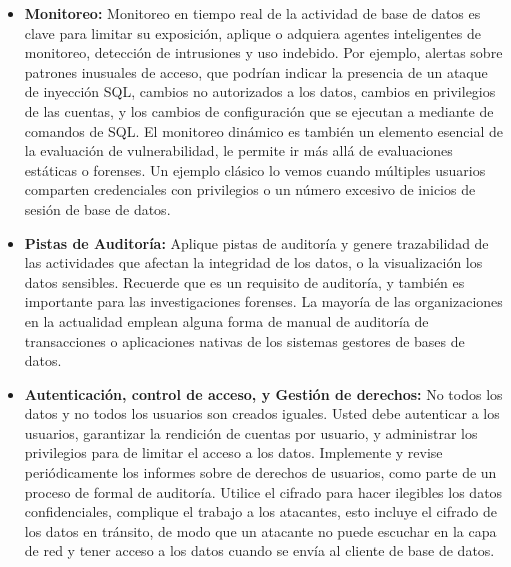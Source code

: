 \documentclass[%
 reprint,
 amsmath,amssymb,
 aps,
]{revtex4-1}
\begin{document}
\begin{itemize}
	\item \textbf{Monitoreo: }Monitoreo en tiempo real de la actividad de base de datos es clave para limitar su exposición, aplique o adquiera agentes inteligentes de monitoreo, detección de intrusiones y uso indebido.
Por ejemplo, alertas sobre patrones inusuales de acceso, que podrían indicar la presencia de un ataque de inyección SQL, cambios no autorizados a los datos, cambios en privilegios de las cuentas, y los cambios de configuración que se ejecutan a mediante de comandos de SQL.
El monitoreo dinámico es también un elemento esencial de la evaluación de vulnerabilidad, le permite ir más allá de evaluaciones estáticas o forenses. Un ejemplo clásico lo vemos cuando múltiples usuarios comparten credenciales con privilegios o un número excesivo de inicios de sesión de base de datos.
	\item \textbf{Pistas de Auditoría: }Aplique pistas de auditoría y genere trazabilidad de las actividades que afectan la integridad de los datos, o la visualización los datos sensibles.
Recuerde que es un requisito de auditoría, y también es importante para las investigaciones forenses.
La mayoría de las organizaciones en la actualidad emplean alguna forma de manual de auditoría de transacciones o aplicaciones nativas de los sistemas gestores de bases de datos. 
	\item \textbf{Autenticación, control de acceso, y Gestión de derechos: }No todos los datos y no todos los usuarios son creados iguales. Usted debe autenticar a los usuarios, garantizar la rendición de cuentas por usuario, y administrar los privilegios para de limitar el acceso a los datos.
Implemente y revise periódicamente los informes sobre de derechos de usuarios, como parte de un proceso de formal de auditoría.
Utilice el cifrado para hacer ilegibles los datos confidenciales, complique el trabajo a los atacantes, esto incluye el cifrado de los datos en tránsito, de modo que un atacante no puede escuchar en la capa de red y tener acceso a los datos cuando se envía al cliente de base de datos. \cite{ff}

\end{itemize}

\end{document}
